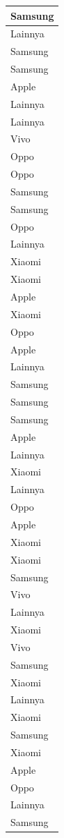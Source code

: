\documentclass[
  letterpaper,
  DIV=11,
  numbers=noendperiod]{scrartcl}
\begin{document}
\begin{table}
\begin{tabular}[t]{l}
\hline
Samsung\\
\hline
Lainnya\\
\hline
Samsung\\
\hline
Samsung\\
\hline
Apple\\
\hline
Lainnya\\
\hline
Lainnya\\
\hline
Vivo\\
\hline
Oppo\\
\hline
Oppo\\
\hline
Samsung\\
\hline
Samsung\\
\hline
Oppo\\
\hline
Lainnya\\
\hline
Xiaomi\\
\hline
Xiaomi\\
\hline
Apple\\
\hline
Xiaomi\\
\hline
Oppo\\
\hline
Apple\\
\hline
Lainnya\\
\hline
Samsung\\
\hline
Samsung\\
\hline
Samsung\\
\hline
Apple\\
\hline
Lainnya\\
\hline
Xiaomi\\
\hline
Lainnya\\
\hline
Oppo\\
\hline
Apple\\
\hline
Xiaomi\\
\hline
Xiaomi\\
\hline
Samsung\\
\hline
Vivo\\
\hline
Lainnya\\
\hline
Xiaomi\\
\hline
Vivo\\
\hline
Samsung\\
\hline
Xiaomi\\
\hline
Lainnya\\
\hline
Xiaomi\\
\hline
Samsung\\
\hline
Xiaomi\\
\hline
Apple\\
\hline
Oppo\\
\hline
Lainnya\\
\hline
Samsung\\

\end{tabular}
\end{table}
\end{document}
